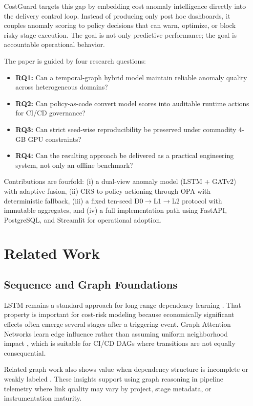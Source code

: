 \documentclass[10pt,twocolumn]{article}
\begin{document}
CostGuard targets this gap by embedding cost anomaly intelligence directly into the delivery control loop. Instead of producing only post hoc dashboards, it couples anomaly scoring to policy decisions that can warn, optimize, or block risky stage execution. The goal is not only predictive performance; the goal is accountable operational behavior.

The paper is guided by four research questions:
\begin{itemize}
\item \textbf{RQ1:} Can a temporal-graph hybrid model maintain reliable anomaly quality across heterogeneous domains?
\item \textbf{RQ2:} Can policy-as-code convert model scores into auditable runtime actions for CI/CD governance?
\item \textbf{RQ3:} Can strict seed-wise reproducibility be preserved under commodity 4-GB GPU constraints?
\item \textbf{RQ4:} Can the resulting approach be delivered as a practical engineering system, not only an offline benchmark?
\end{itemize}

Contributions are fourfold: (i) a dual-view anomaly model (LSTM + GATv2) with adaptive fusion, (ii) CRS-to-policy actioning through OPA with deterministic fallback, (iii) a fixed ten-seed D0$\rightarrow$L1$\rightarrow$L2 protocol with immutable aggregates, and (iv) a full implementation path using FastAPI, PostgreSQL, and Streamlit for operational adoption.

\FloatBarrier
\section{Related Work}
\subsection{Sequence and Graph Foundations}
LSTM remains a standard approach for long-range dependency learning \cite{ref_lstm}. That property is important for cost-risk modeling because economically significant effects often emerge several stages after a triggering event. Graph Attention Networks learn edge influence rather than assuming uniform neighborhood impact \cite{ref_gat}, which is suitable for CI/CD DAGs where transitions are not equally consequential.

Related graph work also shows value when dependency structure is incomplete or weakly labeled \cite{ref_ghostlink,ref_wsvsp}. These insights support using graph reasoning in pipeline telemetry where link quality may vary by project, stage metadata, or instrumentation maturity.
\end{document}
